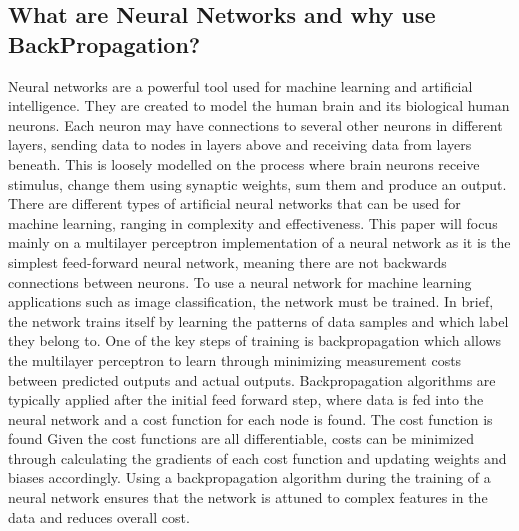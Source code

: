 \documentclass[twocolumn]{article}
\begin{document}
\subsection{What are Neural Networks and why use BackPropagation?}
Neural networks are a powerful tool used for machine learning and artificial intelligence. They are created to model the human brain and its biological human neurons. \cite{gursen} Each neuron may have connections to several other neurons in different layers, sending data to nodes in layers above and receiving data from layers beneath. This is loosely modelled on the process where brain neurons receive stimulus, change them using synaptic weights, sum them and produce an output. \cite{gursen} There are different types of artificial neural networks that can be used for machine learning, ranging in complexity and effectiveness. This paper will focus mainly on a multilayer perceptron implementation of a neural network as it is the simplest feed-forward neural network, meaning there are not backwards connections between neurons. To use a neural network for machine learning applications such as image classification, the network must be trained. In brief, the network trains itself by learning the patterns of data samples and which label they belong to. One of the key steps of training is backpropagation which allows the multilayer perceptron to
learn through minimizing measurement costs between predicted outputs and actual outputs. \cite{popescu} Backpropagation algorithms are typically applied after the initial feed forward step, where data is fed into the neural network and a cost function for each node is found. The cost function is found Given the cost functions are all differentiable, costs can be minimized through calculating the gradients of each cost function and updating weights and biases accordingly. Using a backpropagation algorithm during the training of a neural network ensures that the network is attuned to complex features in the data and reduces overall cost. 
\end{document}
